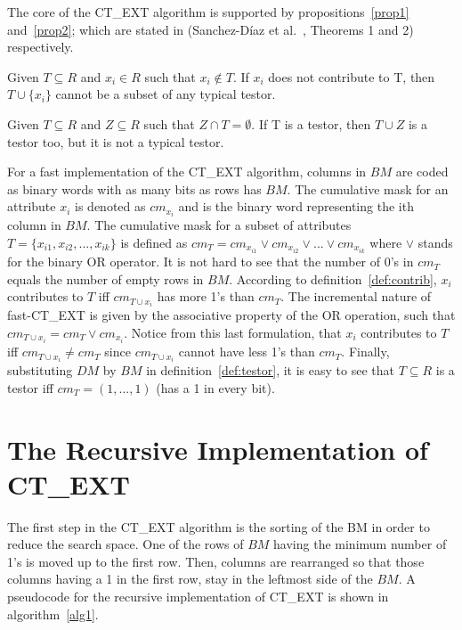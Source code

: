 \documentclass[citeauthoryear]{llncs}
\begin{document}
	The core of the CT\_EXT algorithm is supported by propositions~\ref{prop1} and~\ref{prop2}; which are stated in
	(Sanchez-D\'iaz et al.~\cite{Sanchez2010}, Theorems 1 and 2) respectively.
	
	\begin{proposition}\label{prop1} 
		Given $T \subseteq R$ and  $x_i \in R$ such that $x_i \notin T$. If $x_i$ does not contribute to T, then 
		$T\cup\{x_i\}$ cannot be a subset of any typical testor.
	\end{proposition}

	\begin{proposition}\label{prop2} 
		Given $T \subseteq R$ and $Z \subseteq R$ such that $Z \cap T = \emptyset$. If T is a testor, then $T \cup
		Z$ is a 	testor too, but it is not a typical testor.
	\end{proposition}
	
	For a fast implementation of the CT\_EXT algorithm, columns in $BM$ are coded as binary words with as many 
	bits as 	rows has $BM$. The cumulative mask for an attribute $x_i$ is denoted as $cm_{x_i}$ and is the binary
	word representing the ith column in $BM$. The cumulative mask for a subset of attributes $T=\lbrace
	x_{i1},x_{i2},...,x_{ik} \rbrace$ is defined	as $cm_T = cm_{x_{i1}} \vee cm_{x_{i2}} \vee ... \vee cm_{x_{ik}}$
	where $\vee$ stands for the binary OR operator. It is not hard to see that the number of 0's in $cm_T$ equals
	the number of empty rows in $BM$. According to definition~\ref{def:contrib}, $x_i$ contributes to $T$ iff
	$cm_{T\cup x_i}$ has more 1's than $cm_T$. The incremental nature of fast-CT\_EXT is given by the associative
	property of the OR operation, such that $cm_{T\cup x_i}=cm_T\vee cm_{x_i}$. Notice from this last formulation,
	that $x_i$ contributes to $T$ iff $cm_{T\cup x_i}\neq cm_T$ since $cm_{T\cup x_i}$ cannot have less 1's than
	$cm_T$. Finally, substituting $DM$ by $BM$ in definition~\ref{def:testor}, it is easy to see that $T \subseteq
	R$ is a testor iff $cm_T=(1,...,1)$ (has a 1 in every bit).


\section{The Recursive Implementation of CT\_EXT}
%
	The first step in the CT\_EXT algorithm is the sorting of the BM in order to reduce the search space. One of 
	the rows of $BM$ having the minimum number of 1's is moved up to the first row. Then, columns are rearranged 
	so that those columns having a 1 in the first row, stay in the leftmost side of the $BM$.  A pseudocode for
	the recursive implementation of CT\_EXT is shown in algorithm~\ref{alg1}. 
\end{document}
